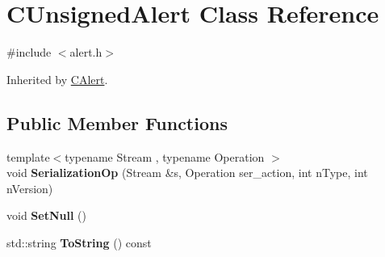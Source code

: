 \hypertarget{class_c_unsigned_alert}{}\section{C\+Unsigned\+Alert Class Reference}
\label{class_c_unsigned_alert}


{\ttfamily \#include $<$alert.\+h$>$}



Inherited by \mbox{\hyperlink{class_c_alert}{C\+Alert}}.

\subsection*{Public Member Functions}
\begin{DoxyCompactItemize}
\item 
\mbox{\label{class_c_unsigned_alert_acdf81abb731f9fc8d2c04618f2f4d79d}} 
{\footnotesize template$<$typename Stream , typename Operation $>$ }\\void {\bfseries Serialization\+Op} (Stream \&s, Operation ser\+\_\+action, int n\+Type, int n\+Version)
\item 
\mbox{\label{class_c_unsigned_alert_a9d387307eb60095e50134d10eea3ad69}} 
void {\bfseries Set\+Null} ()
\item 
\mbox{\label{class_c_unsigned_alert_a1ba948e1de4803565ec0dbec267eadb4}} 
std\+::string {\bfseries To\+String} () const
\end{DoxyCompactItemize}
